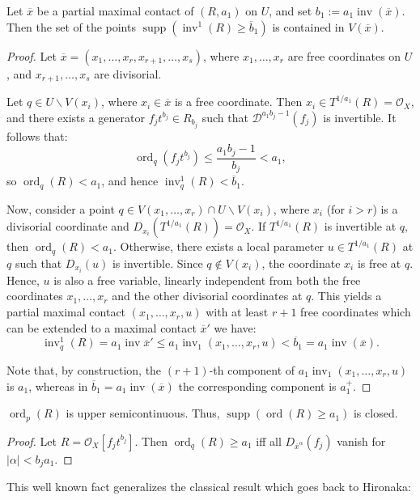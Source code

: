 \documentclass{amsart}
\renewcommand{\cD}{{\mathcal D}}
\newcommand{\cO}{{\mathcal O}}
\renewcommand{\setminus}{\smallsetminus}
\newcommand{\ord}{{\operatorname{ord}}}
\newcommand{\inv}{{\operatorname{inv}}}
\def\supp{{\operatorname{supp}}}
\begin{document}
\begin{lemma} \label{max4}
Let $\overline{x}$ be a partial maximal contact of $(R, a_1)$ on $U$, and set $b_1 := a_1 \inv(\overline{x})$. Then
the set of the points $\supp(\inv^1(R)\geq \overline{b}_1)$  is contained  in 
$V(\overline{x})$.
\end{lemma}
\begin{proof} Let $\overline{x} = (x_1, \ldots, x_r, x_{r+1}, \ldots, x_s)$, where $x_1, \ldots, x_r$ are free coordinates on $U$, and $x_{r+1}, \ldots, x_s$ are divisorial. 

Let $q \in U \setminus V(x_i)$, where $x_i \in \overline{x}$ is a free coordinate. Then $x_i \in T^{1/a_1}(R) = \cO_X$, and there exists a generator $f_j t^{b_j} \in R_{b_j}$ such that $\cD^{a_1 b_j - 1}(f_j)$ is invertible. It follows that:
\[
\ord_q(f_j t^{b_j}) \leq \frac{a_1 b_j - 1}{b_j} < a_1,
\]
so $\ord_q(R) < a_1$, and hence
$
\inv_q^1(R) < \overline{b}_1.
$

Now, consider a point $q \in V(x_1, \dots, x_r) \cap U \setminus V(x_i)$, where $x_i$ (for $i > r$) is a divisorial coordinate and $D_{x_i}(T^{1/a_1}(R)) = \mathcal O_X$. If $T^{1/a_1}(R)$ is invertible at $q$, then $\ord_q(R) < a_1$. Otherwise, there exists a local parameter $ u \in T^{1/a_1}(R) $ at $q$ such that $ D_{x_i}( u ) $ is invertible. Since $q \notin V(x_i)$, the coordinate $ x_i $ is free at $q$. Hence, $ u $ is also a free variable, linearly independent from both the free coordinates $ x_1, \dots, x_r $ and the other divisorial coordinates at $q$. %
This yields a partial maximal contact $(x_1, \ldots, x_r, u)$ with at least $r+1$ free coordinates which can be extended to  a maximal contact $\overline{x}'$ we have:
\[
\inv_q^1(R)= a_1\inv\overline{x}'\leq  a_1 \inv_1(x_1, \ldots, x_r, u) < \overline{b}_1 = a_1 \inv(\overline{x}).
\]

Note that, by construction, the $(r+1)$-th component of $a_1 \inv_1(x_1, \dots, x_r, u)$ is $a_1$, 
whereas in $\overline b_1 = a_1 \inv(\overline x)$ the corresponding component is $a_1^+$.
\end{proof}
\begin{lemma} \label{Giraud3}
$\ord_p(R)$ is upper semicontinuous. Thus, $\supp (\ord(R) \geq a_1)$ is closed.
\end{lemma}
\begin{proof} Let $R=\cO_X[f_jt^{b_j}]$. Then 
$\ord_q(R) \geq a_1$ iff all $D_{\overline{x}^\alpha}(f_j)$ vanish for $|\alpha| < b_j a_1$.
\end{proof}
This well known fact generalizes  the classical result which goes back to Hironaka:
\end{document}

